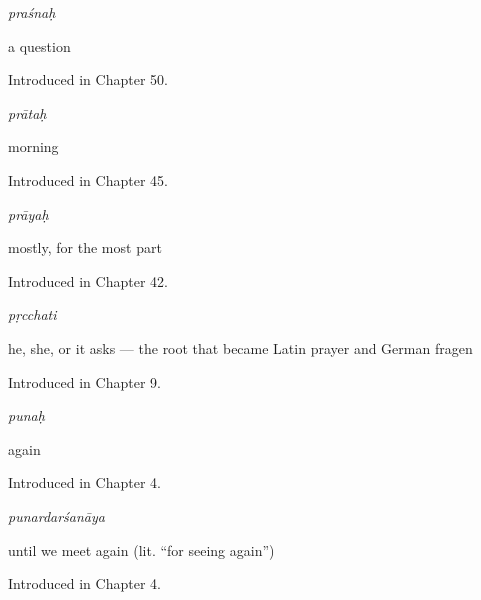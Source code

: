 \noindent\begin{minipage}[t]{\linewidth}
\raggedright
\textbf{}\enspace\emph{praśnaḥ}\par
\small a question\par
\footnotesize Introduced in Chapter 50.
\end{minipage}\par\medskip

\noindent\begin{minipage}[t]{\linewidth}
\raggedright
\textbf{}\enspace\emph{prātaḥ}\par
\small morning\par
\footnotesize Introduced in Chapter 45.
\end{minipage}\par\medskip

\noindent\begin{minipage}[t]{\linewidth}
\raggedright
\textbf{}\enspace\emph{prāyaḥ}\par
\small mostly, for the most part\par
\footnotesize Introduced in Chapter 42.
\end{minipage}\par\medskip

\noindent\begin{minipage}[t]{\linewidth}
\raggedright
\textbf{}\enspace\emph{pṛcchati}\par
\small he, she, or it asks — the root that became Latin prayer and German fragen\par
\footnotesize Introduced in Chapter 9.
\end{minipage}\par\medskip

\noindent\begin{minipage}[t]{\linewidth}
\raggedright
\textbf{}\enspace\emph{punaḥ}\par
\small again\par
\footnotesize Introduced in Chapter 4.
\end{minipage}\par\medskip

\noindent\begin{minipage}[t]{\linewidth}
\raggedright
\textbf{}\enspace\emph{punardarśanāya}\par
\small until we meet again (lit. \textquotedblleft{}for seeing again\textquotedblright{})\par
\footnotesize Introduced in Chapter 4.
\end{minipage}\par\medskip


